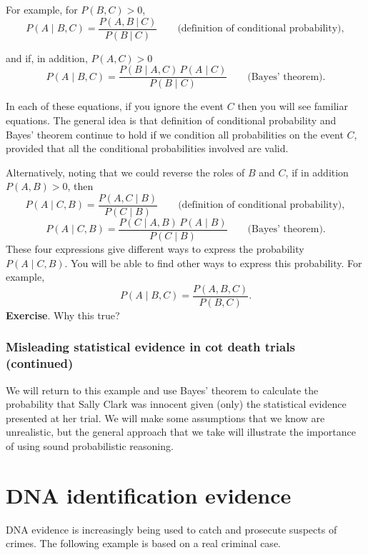 \documentclass[
  british,
  11pt,
  openany, a4paper]{book}
\begin{document}
For example, for \(P(B, C)>0\),
\[ P(A \mid B, C) = \frac{P(A , B~|~C)}{P(B~|~C)} \qquad \text{(definition of conditional probability)}, \]

and if, in addition, \(P(A, C)>0\)
\[ P(A \mid B, C) = \frac{P(B \mid A, C)\,P(A \mid C)}{P(B \mid C)} \qquad \text{(Bayes' theorem)}. \]

In each of these equations, if you ignore the event \(C\) then you will see familiar equations. The general idea is that definition of conditional probability and Bayes' theorem continue to hold if we condition all probabilities on the event \(C\), provided that all the conditional probabilities involved are valid.

Alternatively, noting that we could reverse the roles of \(B\) and \(C\), if in addition \(P(A, B)>0\), then
\[ P(A \mid C, B) = \frac{P(A , C \mid B)}{P(C \mid B)} \qquad \text{(definition of conditional probability)}, \]
\[ P(A \mid C, B) = \frac{P(C \mid A, B)\,P(A \mid B)}{P(C \mid B)} \qquad \text{(Bayes' theorem)}. \]
These four expressions give different ways to express the probability \(P(A \mid C, B)\). You will be able to find other ways to express this probability. For example,\\
\[ P(A \mid B,C) = \frac{P(A, B, C)}{P(B, C)}. \]
\textbf{Exercise}. Why this true?

\subsubsection*{Misleading statistical evidence in cot death trials (continued)}\label{misleading-statistical-evidence-in-cot-death-trials-continued}

We will return to this example and use Bayes' theorem to calculate the probability that Sally Clark was innocent given (only) the statistical evidence presented at her trial. We will make some assumptions that we know are unrealistic, but the general approach that we take will illustrate the importance of using sound probabilistic reasoning.

\section{DNA identification evidence}\label{dna-identification-evidence}

DNA evidence is increasingly being used to catch and prosecute suspects of crimes. The following example is based on a real criminal case.
\end{document}
